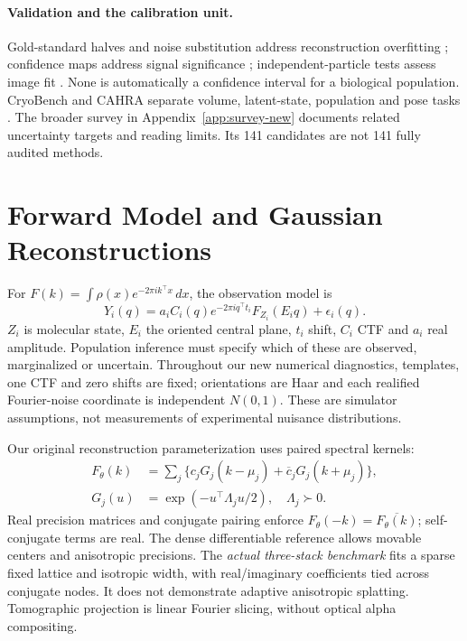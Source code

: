 \documentclass{article}
\begin{document}
\paragraph{Validation and the calibration unit.}
Gold-standard halves and noise substitution address reconstruction overfitting
\citep{schereschen2012,chen2013}; confidence maps address signal significance
\citep{beckers2019,beckers2020}; independent-particle tests assess image fit
\citep{independent2020}. None is automatically a confidence interval for a
biological population. CryoBench and CAHRA separate volume, latent-state,
population and pose tasks \citep{cryobench2025,cahra2026}. The broader survey
in Appendix~\ref{app:survey-new} documents related uncertainty targets and
reading limits. Its 141 candidates are not 141 fully audited methods.

\section{Forward Model and Gaussian Reconstructions}
For $F(k)=\int\rho(x)e^{-2\pi i k^\top x}\,dx$, the observation model is
\begin{equation}\label{eq:forward-new}
 Y_i(q)=a_i C_i(q)e^{-2\pi i q^\top t_i}F_{Z_i}(E_iq)+\epsilon_i(q).
\end{equation}
$Z_i$ is molecular state, $E_i$ the oriented central plane, $t_i$ shift,
$C_i$ CTF and $a_i$ real amplitude. Population inference must specify which
of these are observed, marginalized or uncertain. Throughout our new
numerical diagnostics, templates, one CTF and zero shifts are fixed;
orientations are Haar and each realified Fourier-noise coordinate is
independent $N(0,1)$. These are simulator assumptions, not measurements of
experimental nuisance distributions.

Our original reconstruction parameterization uses paired spectral kernels:
\begin{align}\label{eq:splats-new}
F_\theta(k)&=\sum_j\{c_j G_j(k-\mu_j)+\overline c_jG_j(k+\mu_j)\},\\
G_j(u)&=\exp(-u^\top\Lambda_j u/2),\quad \Lambda_j\succ0.\nonumber
\end{align}
Real precision matrices and conjugate pairing enforce
$F_\theta(-k)=\overline{F_\theta(k)}$; self-conjugate terms are real.
The dense differentiable reference allows movable centers and anisotropic
precisions. The \emph{actual three-stack benchmark} fits a sparse fixed
lattice and isotropic width, with real/imaginary coefficients tied across
conjugate nodes. It does not demonstrate adaptive anisotropic splatting.
Tomographic projection is linear Fourier slicing, without optical alpha
compositing.
\end{document}
